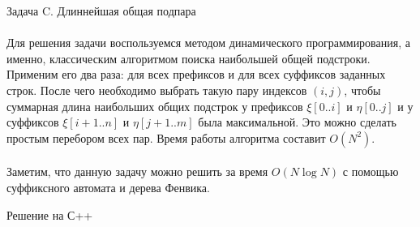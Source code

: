 {\large Задача C. Длиннейшая общая подпара} 
\\
\\
Для решения задачи воспользуемся методом динамического программирования, а именно, классическим алгоритмом поиска наибольшей общей подстроки. Применим его два раза: для всех префиксов и для всех суффиксов заданных строк. После чего необходимо выбрать такую пару индексов $(i, j)$, чтобы суммарная длина наибольших общих подстрок у префиксов $\xi[0..i]$ и $\eta[0..j]$ и у суффиксов $\xi[i+1..n]$ и $\eta[j+1..m]$ была максимальной. Это можно сделать простым перебором всех пар. Время работы алгоритма составит $O(N^2)$.
\\
\\
Заметим, что данную задачу можно решить за время $O(N \log N)$ с помощью суффиксного автомата и дерева Фенвика.

\newpage
{\large Решение на С++}
\\
\\

